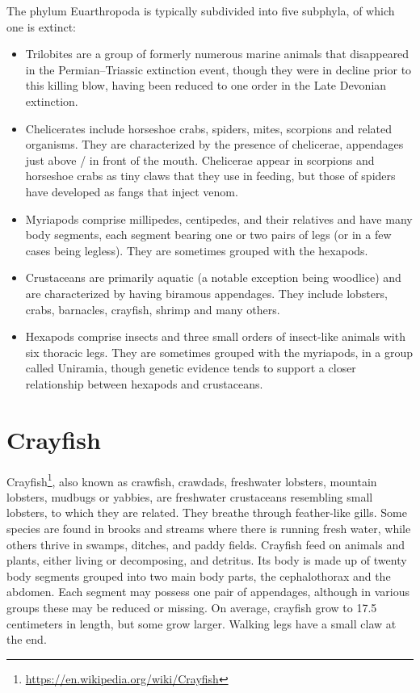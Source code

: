 \documentclass[]{book}
\providecommand{\tightlist}{%
  \setlength{\itemsep}{0pt}\setlength{\parskip}{0pt}}
\let\rmarkdownfootnote\footnote%
\def\footnote{\protect\rmarkdownfootnote}
\renewcommand{\href}[2]{#2\footnote{\url{#1}}}
\theoremstyle{definition}
\theoremstyle{definition}
\theoremstyle{definition}
\theoremstyle{remark}
\begin{document}
The phylum Euarthropoda is typically subdivided into five subphyla, of
which one is extinct:

\begin{itemize}
\tightlist
\item
  Trilobites are a group of formerly numerous marine animals that
  disappeared in the Permian--Triassic extinction event, though they
  were in decline prior to this killing blow, having been reduced to one
  order in the Late Devonian extinction.
\item
  Chelicerates include horseshoe crabs, spiders, mites, scorpions and
  related organisms. They are characterized by the presence of
  chelicerae, appendages just above / in front of the mouth. Chelicerae
  appear in scorpions and horseshoe crabs as tiny claws that they use in
  feeding, but those of spiders have developed as fangs that inject
  venom.
\item
  Myriapods comprise millipedes, centipedes, and their relatives and
  have many body segments, each segment bearing one or two pairs of legs
  (or in a few cases being legless). They are sometimes grouped with the
  hexapods.
\item
  Crustaceans are primarily aquatic (a notable exception being woodlice)
  and are characterized by having biramous appendages. They include
  lobsters, crabs, barnacles, crayfish, shrimp and many others.
\item
  Hexapods comprise insects and three small orders of insect-like
  animals with six thoracic legs. They are sometimes grouped with the
  myriapods, in a group called Uniramia, though genetic evidence tends
  to support a closer relationship between hexapods and crustaceans.
\end{itemize}

\section{Crayfish}\label{crayfish}

\href{https://en.wikipedia.org/wiki/Crayfish}{Crayfish}, also known as
crawfish, crawdads, freshwater lobsters, mountain lobsters, mudbugs or
yabbies, are freshwater crustaceans resembling small lobsters, to which
they are related. They breathe through feather-like gills. Some species
are found in brooks and streams where there is running fresh water,
while others thrive in swamps, ditches, and paddy fields. Crayfish feed
on animals and plants, either living or decomposing, and detritus. Its
body is made up of twenty body segments grouped into two main body
parts, the cephalothorax and the abdomen. Each segment may possess one
pair of appendages, although in various groups these may be reduced or
missing. On average, crayfish grow to 17.5 centimeters in length, but
some grow larger. Walking legs have a small claw at the end.
\end{document}
